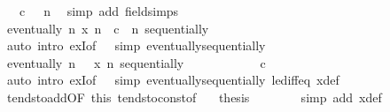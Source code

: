 \begin{isabellebody}
\ {\isacartoucheopen}{}\ {\isasymle}\ c{\isacartoucheclose}\ {\isacartoucheopen}{}\ {\isacharless}{\kern0pt}\ n{\isacartoucheclose}\ \isamarkupfalse%
\ {\isacharparenleft}{\kern0pt}simp\ add{\isacharcolon}{\kern0pt}\ field{\isacharunderscore}{\kern0pt}simps{\isacharparenright}{\kern0pt}\isanewline
\ \ \ \ \ \ \isamarkupfalse%
\isanewline
\ \ \ \ \ \ \isamarkupfalse%
\ \isamarkupfalse%
\ {\isachardoublequoteopen}eventually\ {\isacharparenleft}{\kern0pt}{\isasymlambda}n{\isachardot}{\kern0pt}\ x\ n\ {\isasymle}\ c\ {\isacharslash}{\kern0pt}\ n{\isacharparenright}{\kern0pt}\ sequentially{\isachardoublequoteclose}\isanewline
\ \ \ \ \ \ \ \ \isamarkupfalse%
\ {\isacharparenleft}{\kern0pt}auto\ intro{\isacharbang}{\kern0pt}{\isacharcolon}{\kern0pt}\ exI{\isacharbrackleft}{\kern0pt}of\ {\isacharunderscore}{\kern0pt}\ {}{\isacharbrackright}{\kern0pt}\ simp{\isacharcolon}{\kern0pt}\ eventually{\isacharunderscore}{\kern0pt}sequentially{\isacharparenright}{\kern0pt}\isanewline
\ \ \ \ \ \ \isamarkupfalse%
\ {\isachardoublequoteopen}eventually\ {\isacharparenleft}{\kern0pt}{\isasymlambda}n{\isachardot}{\kern0pt}\ {}\ {\isasymle}\ x\ n{\isacharparenright}{\kern0pt}\ sequentially{\isachardoublequoteclose}\isanewline
\ \ \ \ \ \ \ \ \isamarkupfalse%
\ {\isacartoucheopen}{}\ {\isasymle}\ c{\isacartoucheclose}\isanewline
\ \ \ \ \ \ \ \ \isamarkupfalse%
\ {\isacharparenleft}{\kern0pt}auto\ intro{\isacharbang}{\kern0pt}{\isacharcolon}{\kern0pt}\ exI{\isacharbrackleft}{\kern0pt}of\ {\isacharunderscore}{\kern0pt}\ {}{\isacharbrackright}{\kern0pt}\ simp{\isacharcolon}{\kern0pt}\ eventually{\isacharunderscore}{\kern0pt}sequentially\ le{\isacharunderscore}{\kern0pt}diff{\isacharunderscore}{\kern0pt}eq\ x{\isacharunderscore}{\kern0pt}def{\isacharparenright}{\kern0pt}\isanewline
\ \ \ \ \isamarkupfalse%
\isanewline
\ \ \ \ \isamarkupfalse%
\ tendsto{\isacharunderscore}{\kern0pt}add{\isacharbrackleft}{\kern0pt}OF\ this\ tendsto{\isacharunderscore}{\kern0pt}const{\isacharbrackleft}{\kern0pt}of\ {}{\isacharbrackright}{\kern0pt}{\isacharbrackright}{\kern0pt}\ \isamarkupfalse%
\ {\isacharquery}{\kern0pt}thesis\isanewline
\ \ \ \ \ \ \isamarkupfalse%
\ {\isacharparenleft}{\kern0pt}simp\ add{\isacharcolon}{\kern0pt}\ x{\isacharunderscore}{\kern0pt}def{\isacharparenright}{\kern0pt}\isanewline
\ \ \isamarkupfalse%

\end{isabellebody}
